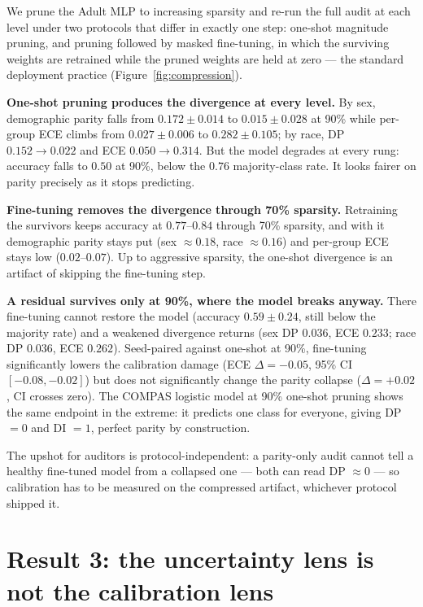 \documentclass{article}
\begin{document}
We prune the Adult MLP to increasing sparsity and re-run the full audit at each level under two protocols that differ in exactly one step: one-shot magnitude pruning, and pruning followed by masked fine-tuning, in which the surviving weights are retrained while the pruned weights are held at zero --- the standard deployment practice (Figure~\ref{fig:compression}).

\textbf{One-shot pruning produces the divergence at every level.} By sex, demographic parity falls from $0.172 \pm 0.014$ to $0.015 \pm 0.028$ at 90\% while per-group ECE climbs from $0.027 \pm 0.006$ to $0.282 \pm 0.105$; by race, DP $0.152 \rightarrow 0.022$ and ECE $0.050 \rightarrow 0.314$. But the model degrades at every rung: accuracy falls to $0.50$ at 90\%, below the $0.76$ majority-class rate. It looks fairer on parity precisely as it stops predicting.

\textbf{Fine-tuning removes the divergence through 70\% sparsity.} Retraining the survivors keeps accuracy at $0.77$--$0.84$ through 70\% sparsity, and with it demographic parity stays put (sex $\approx 0.18$, race $\approx 0.16$) and per-group ECE stays low ($0.02$--$0.07$). Up to aggressive sparsity, the one-shot divergence is an artifact of skipping the fine-tuning step.

\textbf{A residual survives only at 90\%, where the model breaks anyway.} There fine-tuning cannot restore the model (accuracy $0.59 \pm 0.24$, still below the majority rate) and a weakened divergence returns (sex DP $0.036$, ECE $0.233$; race DP $0.036$, ECE $0.262$). Seed-paired against one-shot at 90\%, fine-tuning significantly lowers the calibration damage (ECE $\Delta = -0.05$, 95\% CI $[-0.08, -0.02]$) but does not significantly change the parity collapse ($\Delta = +0.02$, CI crosses zero). The COMPAS logistic model at 90\% one-shot pruning shows the same endpoint in the extreme: it predicts one class for everyone, giving DP $=0$ and DI $=1$, perfect parity by construction.

The upshot for auditors is protocol-independent: a parity-only audit cannot tell a healthy fine-tuned model from a collapsed one --- both can read DP $\approx 0$ --- so calibration has to be measured on the compressed artifact, whichever protocol shipped it.

\section{Result 3: the uncertainty lens is not the calibration lens}
\label{sec:finding3}
\end{document}
